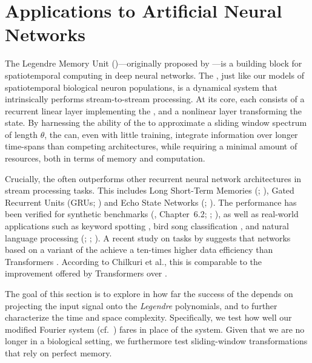 
\section{Applications to Artificial Neural Networks}
\label{sec:applications_to_ml}

The Legendre Memory Unit (\LMU)---originally proposed by \citet{voelker2019lmu}---is a building block for spatiotemporal computing in deep neural networks.
The \LMU, just like our models of spatiotemporal biological neuron populations, is a dynamical system that intrinsically performs stream-to-stream processing.
At its core, each \LMU consists of a recurrent linear layer implementing the \LDN, and a nonlinear layer transforming the \LDN state.
By harnessing the ability of the \LDN to approximate a sliding window spectrum of length $\theta$, the \LMU can, even with little training, integrate information over longer time-spans than competing architectures, while requiring a minimal amount of resources, both in terms of memory and computation.

Crucially, the \LMU often outperforms other recurrent neural network architectures in stream processing tasks.
This includes Long Short-Term Memories (\LSTMpl; \cite{hochreiter1997long}), Gated Recurrent Units (GRUs; \cite{chung2014empirical}) and Echo State Networks (\ESNpl; \cite{jaeger2004harnessing}).
The \LMU performance has been verified for synthetic benchmarks (\cite{voelker2019}, Chapter~6.2; \cite{voelker2019lmu}; \cite{gu2020hippo}), as well as real-world applications such as keyword spotting \citep{blouw2021hardware}, bird song classification \citep{gupta2021comparing}, and natural language processing (\NLP; \cite{chilkuri2021parallelizinga}; \cite{chilkuri2021parallelizing}).
A recent study on \NLP tasks by \citet{chilkuri2021language} suggests that networks based on a variant of the \LMU achieve a ten-times higher data efficiency than Transformers \citep{vaswani2017attention}.
According to Chilkuri et al., this is comparable to the improvement offered by Transformers over \LSTMpl.

The goal of this section is to explore in how far the success of the \LMU depends on projecting the input signal onto the \emph{Legendre} polynomials, and to further characterize the \LMU time and space complexity.
Specifically, we test how well our modified Fourier system (cf.~) fares in place of the \LDN system.
Given that we are no longer in a biological setting, we furthermore test sliding-window transformations that rely on perfect memory.

